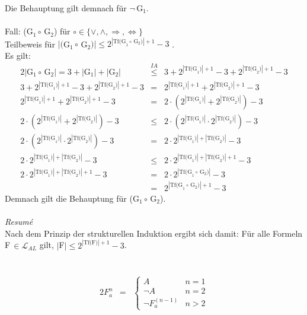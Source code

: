 \documentclass[10pt,a4paper,oneside,ngerman,numbers=noenddot]{scrartcl}
\begin{document}
Die Behauptung gilt demnach für $\neg \,$G$_{1}$.\\
\\
Fall: (G$_{1} \circ \,$G$_{2}$) für $\circ \in \{\vee, \wedge, \Rightarrow, \Leftrightarrow\}$\\
Teilbeweis für $|($G$_{1} \circ \,$G$_{2})| \leq 2^{|\text{Tf(G}_{1} \circ \,\text{G}_{2}\text{)}|+1}-3$ .\\
Es gilt:\\
\begin{alignat*}{2}
|\text{G}_{1} \circ \,\text{G}_{2}| = 3 + |\text{G}_{1}| + |\text{G}_{2}| &\overset{IA}{\leq}& 3 + 2^{|\text{Tf(G}_{1}\text{)}|+1}-3 + 2^{|\text{Tf(G}_{2}\text{)}|+1}-3 \\
3 + 2^{|\text{Tf(G}_{1}\text{)}|+1}-3 + 2^{|\text{Tf(G}_{2}\text{)}|+1}-3 &=& 2^{|\text{Tf(G}_{1}\text{)}|+1} + 2^{|\text{Tf(G}_{2}\text{)}|+1}-3 \\
2^{|\text{Tf(G}_{1}\text{)}|+1} + 2^{|\text{Tf(G}_{2}\text{)}|+1}-3 &=& 2 \cdot \left(2^{|\text{Tf(G}_{1}\text{)}|}+2^{|\text{Tf(G}_{2}\text{)}|}\right) -3 \\
2 \cdot \left(2^{|\text{Tf(G}_{1}\text{)}|}+2^{|\text{Tf(G}_{2}\text{)}|}\right) -3 &\leq & 2 \cdot \left(2^{|\text{Tf(G}_{1}\text{)}|} \cdot 2^{|\text{Tf(G}_{2}\text{)}|}\right) -3 \\
2 \cdot \left(2^{|\text{Tf(G}_{1}\text{)}|} \cdot 2^{|\text{Tf(G}_{2}\text{)}|}\right) -3 &=& 2 \cdot 2^{|\text{Tf(G}_{1}\text{)}|+|\text{Tf(G}_{2}\text{)}|} -3 \\
2 \cdot 2^{|\text{Tf(G}_{1}\text{)}|+|\text{Tf(G}_{2}\text{)}|} -3 &\leq & 2 \cdot 2^{|\text{Tf(G}_{1}\text{)}|+|\text{Tf(G}_{2}\text{)}| + 1} -3 \\
2 \cdot 2^{|\text{Tf(G}_{1}\text{)}|+|\text{Tf(G}_{2}\text{)}| + 1} -3 &=& 2 \cdot 2^{|\text{Tf(G}_{1} \circ \,\text{G}_{2}\text{)}|} -3 \\
&=& 2^{|\text{Tf(G}_{1} \circ \,\text{G}_{2}\text{)}|+1} - 3
\end{alignat*}
Demnach gilt die Behauptung für (G$_{1} \circ \,$G$_{2}$).\\
\\
\textit{Resumé}\\
Nach dem Prinzip der strukturellen Induktion ergibt sich damit: Für alle Formeln F$\, \in \mathcal{L}_{AL}$
gilt, $|$F$| \leq 2^{|\text{Tf(F)}|+1}-3$.
\section{} %
\subsection{} %
\begin{alignat*}{2}
F^{n}_{a} &=& \begin{cases}
A & n=1\\
\neg A & n=2 \\
\neg F^{(n-1)}_{a} & n > 2
\end{cases}
\end{alignat*}
\end{document}
